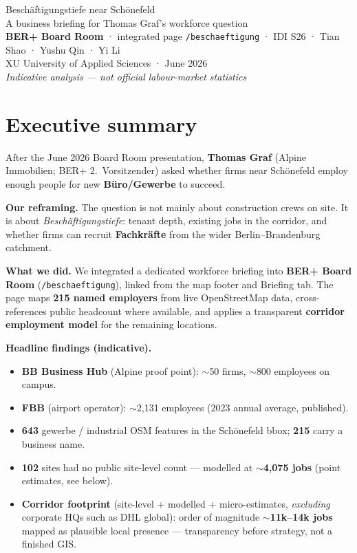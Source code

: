\documentclass[10pt,a4paper]{article}
\newcommand{\berhub}{\textbf{BER+ Board Room}}
\newcommand{\sectionrule}{\vspace{0.25em}{\color{black!20}\hrule height 0.4pt}\vspace{0.45em}}
\begin{document}
\begin{center}
  {\LARGE Beschäftigungstiefe near Schönefeld}\\[0.25em]
  {\large A business briefing for Thomas Graf's workforce question}\\[0.4em]
  {\normalsize \berhub{} · integrated page \texttt{/beschaeftigung} · IDI S26 · Tian Shao · Yushu Qin · Yi Li}\\[0.15em]
  {\small XU University of Applied Sciences · June 2026}\\[0.3em]
  {\small\textit{Indicative analysis --- not official labour-market statistics}}
\end{center}
\sectionrule

\section*{Executive summary}
After the June 2026 Board Room presentation, \textbf{Thomas Graf} (Alpine Immobilien; BER+ 2.\ Vorsitzender) asked whether firms near Schönefeld employ enough people for new \textbf{Büro/Gewerbe} to succeed.

\textbf{Our reframing.} The question is not mainly about construction crews on site. It is about \textit{Beschäftigungstiefe}: tenant depth, existing jobs in the corridor, and whether firms can recruit \textbf{Fachkräfte} from the wider Berlin--Brandenburg catchment.

\textbf{What we did.} We integrated a dedicated workforce briefing into \berhub{} (\texttt{/beschaeftigung}), linked from the map footer and Briefing tab. The page maps \textbf{215 named employers} from live OpenStreetMap data, cross-references public headcount where available, and applies a transparent \textbf{corridor employment model} for the remaining locations.

\textbf{Headline findings (indicative).}
\begin{itemize}
  \setlength{\itemsep}{0.12em}
  \item \textbf{BB Business Hub} (Alpine proof point): $\sim$50 firms, $\sim$800 employees on campus.
  \item \textbf{FBB} (airport operator): $\sim$2{,}131 employees (2023 annual average, published).
  \item \textbf{643} gewerbe / industrial OSM features in the Schönefeld bbox; \textbf{215} carry a business name.
  \item \textbf{102} sites had no public site-level count --- modelled at \textbf{$\sim$4{,}075 jobs} (point estimates, see below).
  \item \textbf{Corridor footprint} (site-level + modelled + micro-estimates, \textit{excluding} corporate HQs such as DHL global): order of magnitude \textbf{$\sim$11k--14k jobs} mapped as plausible local presence --- transparency before strategy, not a finished GIS.
\end{itemize}
\end{document}
